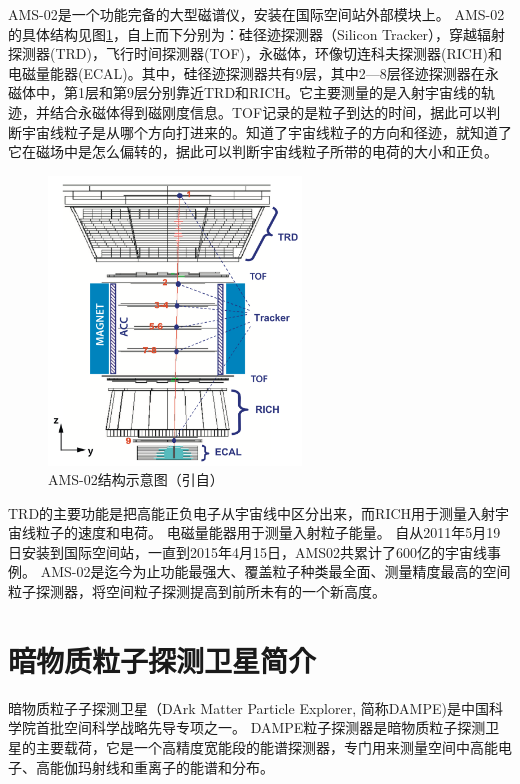 AMS-02是一个功能完备的大型磁谱仪，安装在国际空间站外部模块上。
AMS-02的具体结构见图\ref{fig:introduction:ams02}，自上而下分别为：硅径迹探测器（Silicon Tracker），穿越辐射探测器(TRD)，飞行时间探测器(TOF)，永磁体，环像切连科夫探测器(RICH)和电磁量能器(ECAL)。其中，硅径迹探测器共有9层，其中2—8层径迹探测器在永磁体中，第1层和第9层分别靠近TRD和RICH。它主要测量的是入射宇宙线的轨迹，并结合永磁体得到磁刚度信息。TOF记录的是粒子到达的时间，据此可以判断宇宙线粒子是从哪个方向打进来的。知道了宇宙线粒子的方向和径迹，就知道了它在磁场中是怎么偏转的，据此可以判断宇宙线粒子所带的电荷的大小和正负。
\begin{figure}[htbp]
	\centering
	\includegraphics[width=0.6\textwidth]{chap/introduction/fig/ams022.png}
	\caption{AMS-02结构示意图（引自\parencite{ams02_detector}）}
	\label{fig:introduction:ams02}
\end{figure}
TRD的主要功能是把高能正负电子从宇宙线中区分出来，而RICH用于测量入射宇宙线粒子的速度和电荷。
电磁量能器用于测量入射粒子能量。
自从2011年5月19日安装到国际空间站，一直到2015年4月15日，AMS02共累计了600亿的宇宙线事例。
AMS-02是迄今为止功能最强大、覆盖粒子种类最全面、测量精度最高的空间粒子探测器，将空间粒子探测提高到前所未有的一个新高度。


\section{暗物质粒子探测卫星简介}
暗物质粒子子探测卫星（DArk Matter Particle Explorer, 简称DAMPE)是中国科学院首批空间科学战略先导专项之一。
DAMPE粒子探测器是暗物质粒子探测卫星的主要载荷，它是一个高精度宽能段的能谱探测器，专门用来测量空间中高能电子、高能伽玛射线和重离子的能谱和分布。

